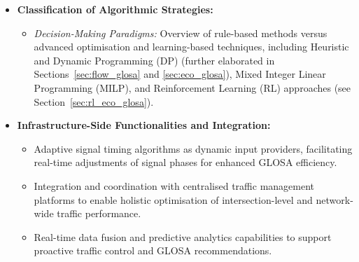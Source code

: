\begin{itemize}
    \item \textbf{Classification of Algorithmic Strategies:}
    \begin{itemize}
        \item \textit{Decision-Making Paradigms:} Overview of rule-based methods versus advanced optimisation and learning-based techniques, including Heuristic and Dynamic Programming (DP) (further elaborated in Sections~\ref{sec:flow_glosa} and \ref{sec:eco_glosa}), Mixed Integer Linear Programming (MILP), and Reinforcement Learning (RL) approaches (see Section~\ref{sec:rl_eco_glosa}).
    \end{itemize}

    \item \textbf{Infrastructure-Side Functionalities and Integration:}
    \begin{itemize}
        \item Adaptive signal timing algorithms as dynamic input providers, facilitating real-time adjustments of signal phases for enhanced GLOSA efficiency.
        \item Integration and coordination with centralised traffic management platforms to enable holistic optimisation of intersection-level and network-wide traffic performance.
        \item Real-time data fusion and predictive analytics capabilities to support proactive traffic control and GLOSA recommendations.
    \end{itemize}


\end{itemize}
